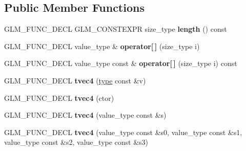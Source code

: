 \subsection*{Public Member Functions}
\begin{DoxyCompactItemize}
\item 
\hypertarget{structglm_1_1detail_1_1tvec4_abf7879a66d8c8e3bb413216055568c5a}{}G\+L\+M\+\_\+\+F\+U\+N\+C\+\_\+\+D\+E\+C\+L G\+L\+M\+\_\+\+C\+O\+N\+S\+T\+E\+X\+P\+R size\+\_\+type {\bfseries length} () const \label{structglm_1_1detail_1_1tvec4_abf7879a66d8c8e3bb413216055568c5a}

\item 
\hypertarget{structglm_1_1detail_1_1tvec4_a36ddbd2ee45cd2eba80e479c349c4c21}{}G\+L\+M\+\_\+\+F\+U\+N\+C\+\_\+\+D\+E\+C\+L value\+\_\+type \& {\bfseries operator\mbox{[}$\,$\mbox{]}} (size\+\_\+type i)\label{structglm_1_1detail_1_1tvec4_a36ddbd2ee45cd2eba80e479c349c4c21}

\item 
\hypertarget{structglm_1_1detail_1_1tvec4_a3dbc4e601a499b4317f9fdbd98c6316e}{}G\+L\+M\+\_\+\+F\+U\+N\+C\+\_\+\+D\+E\+C\+L value\+\_\+type const \& {\bfseries operator\mbox{[}$\,$\mbox{]}} (size\+\_\+type i) const \label{structglm_1_1detail_1_1tvec4_a3dbc4e601a499b4317f9fdbd98c6316e}

\item 
\hypertarget{structglm_1_1detail_1_1tvec4_a4bdded9554fe40d756d1053f34d0630f}{}G\+L\+M\+\_\+\+F\+U\+N\+C\+\_\+\+D\+E\+C\+L {\bfseries tvec4} (\hyperlink{structglm_1_1detail_1_1tvec4}{type} const \&v)\label{structglm_1_1detail_1_1tvec4_a4bdded9554fe40d756d1053f34d0630f}

\item 
\hypertarget{structglm_1_1detail_1_1tvec4_a41263083d8c13d7a5ac082662e362e39}{}G\+L\+M\+\_\+\+F\+U\+N\+C\+\_\+\+D\+E\+C\+L {\bfseries tvec4} (ctor)\label{structglm_1_1detail_1_1tvec4_a41263083d8c13d7a5ac082662e362e39}

\item 
\hypertarget{structglm_1_1detail_1_1tvec4_a3b0f7edb1ddfd5cbf098d66b2ffe3607}{}G\+L\+M\+\_\+\+F\+U\+N\+C\+\_\+\+D\+E\+C\+L {\bfseries tvec4} (value\+\_\+type const \&s)\label{structglm_1_1detail_1_1tvec4_a3b0f7edb1ddfd5cbf098d66b2ffe3607}

\item 
\hypertarget{structglm_1_1detail_1_1tvec4_ad982f73c86d64540e263102067828e0e}{}G\+L\+M\+\_\+\+F\+U\+N\+C\+\_\+\+D\+E\+C\+L {\bfseries tvec4} (value\+\_\+type const \&s0, value\+\_\+type const \&s1, value\+\_\+type const \&s2, value\+\_\+type const \&s3)\label{structglm_1_1detail_1_1tvec4_ad982f73c86d64540e263102067828e0e}


\end{DoxyCompactItemize}
